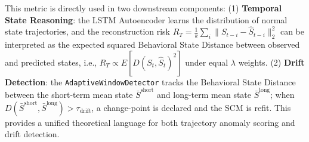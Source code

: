 This metric is directly used in two downstream components: (1) \textbf{Temporal State Reasoning}: the LSTM Autoencoder learns the distribution of normal state trajectories, and the reconstruction risk $R_T = \frac{1}{k}\sum_{i} \|S_{t-i} - \hat{S}_{t-i}\|_2^2$ can be interpreted as the expected squared Behavioral State Distance between observed and predicted states, i.e., $R_T \propto E[D(S_t, \hat{S}_t)^2]$ under equal $\lambda$ weights. (2) \textbf{Drift Detection}: the \texttt{AdaptiveWindowDetector} tracks the Behavioral State Distance between the short-term mean state $\bar{S}^{\text{short}}$ and long-term mean state $\bar{S}^{\text{long}}$; when $D(\bar{S}^{\text{short}}, \bar{S}^{\text{long}}) > \tau_{\text{drift}}$, a change-point is declared and the SCM is refit. This provides a unified theoretical language for both trajectory anomaly scoring and drift detection.

